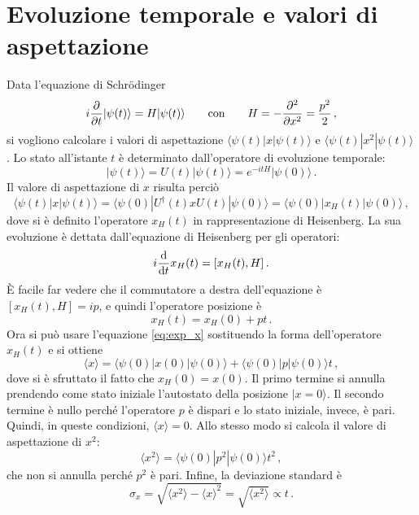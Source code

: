 \documentclass[a4paper, titlepage]{article}
\numberwithin{equation}{section}
\begin{document}
\section{Evoluzione temporale e valori di aspettazione}
\label{sec:evol}
Data l'equazione di Schrödinger
\[
    i\pdv{t}|\psi(t)\rangle = H|\psi(t)\rangle 
    \qquad \text{con} \qquad
    H = -\pdv[2]{x} = \frac{p^2}{2}\, ,
\]
si vogliono calcolare i valori di aspettazione $\langle\psi(t)|x|\psi(t)\rangle$ e $\langle\psi(t)|x^2|\psi(t)\rangle$. Lo stato all'istante $t$ è determinato dall'operatore di evoluzione temporale:
\[
    |\psi(t)\rangle = U(t)|\psi(t)\rangle = e^{-itH} |\psi(0)\rangle\, .
\]
Il valore di aspettazione di $x$ risulta perciò
\begin{equation}
    \langle\psi(t)|x|\psi(t)\rangle = \langle\psi(0)|U^\dagger(t) x U(t)|\psi(0)\rangle = \langle\psi(0)|x_H(t)|\psi(0)\rangle\, ,
    \label{eq:exp_x}
\end{equation}
dove si è definito l'operatore $x_H(t)$ in rappresentazione di Heisenberg. La sua evoluzione è dettata dall'equazione di Heisenberg per gli operatori:
\[
    i\dv{t}x_H(t) = [x_H(t), H]\, .
\]
È facile far vedere che il commutatore a destra dell'equazione è $[x_H(t), H] = ip$, e quindi l'operatore posizione è 
\[
    x_H(t) = x_H(0) + pt\, .
\]
Ora si può usare l'equazione \eqref{eq:exp_x} sostituendo la forma dell'operatore $x_H(t)$ e si ottiene
\begin{equation*}
    \langle x \rangle = \langle\psi(0)|x(0)|\psi(0)\rangle + \langle\psi(0)|p|\psi(0)\rangle t\, ,
\end{equation*}
dove si è sfruttato il fatto che $x_H(0) = x(0)$. Il primo termine si annulla prendendo come stato iniziale l'autostato della posizione $|x = 0\rangle$. Il secondo termine è nullo perché l'operatore $p$ è dispari e lo stato iniziale, invece, è pari. Quindi, in queste condizioni, $\langle x \rangle = 0$. Allo stesso modo si calcola il valore di aspettazione di $x^2$:
\begin{equation*}
    \langle x^2 \rangle = \langle\psi(0)|p^2|\psi(0)\rangle t^2\, ,
\end{equation*}
che non si annulla perché $p^2$ è pari. Infine, la deviazione standard è
\[
    \sigma_x = \sqrt{\langle x^2 \rangle - \langle x \rangle^2} = \sqrt{\langle x^2 \rangle} \propto t\, .
\]
\end{document}
